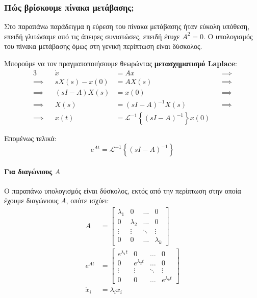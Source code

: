 \documentclass[11pt,a4paper,notitlepage,fleqn]{article}
\begin{document}
\subsubsection{Πώς βρίσκουμε πίνακα μετάβασης;}

Στο παραπάνω παράδειγμα η εύρεση του πίνακα μετάβασης ήταν εύκολη υπόθεση, επειδή γλιτώσαμε από τις άπειρες
συνιστώσες, επειδή έτυχε \( A^2 = 0 \). Ο υπολογισμός του πίνακα μετάβασης όμως στη γενική περίπτωση είναι
δύσκολος.

Μπορούμε να τον πραγματοποιήσουμε θεωρώντας \textbf{μετασχηματισμό Laplace}:
\begin{alignat*}{3}
	&& \dot x &= Ax &&\implies \\
	\implies && sX(s) - x(0) &= AX(s) &&\implies \\
	\implies && (sI-A)X(s) &= x(0) &&\implies \\
	\implies && X(s) &= (sI-A)^{-1} X(s) &&\implies \\
	\implies && x(t) &= \mathscr L^{-1} \left\lbrace (sI-A)^{-1} \right\rbrace x(0)
\end{alignat*}

Επομένως τελικά:
\[
\boxed{e^{At} = \mathscr{L}^{-1} \left\lbrace (sI-A)^{-1} \right\rbrace}
\]

\paragraph{Για διαγώνιους \(A\)}
Ο παραπάνω υπολογισμός είναι δύσκολος, εκτός από την περίπτωση στην οποία έχουμε διαγώνιους \( A \), οπότε ισχύει:
\begin{align*}
	A &= \left[\begin{matrix}
	\lambda_1 & 0 & \hdots & 0 \\
	0 & \lambda_2 & \hdots & 0 \\
	\vdots & \vdots & \ddots & \vdots \\
	0 & 0 & \hdots & \lambda_k
	\end{matrix}\right] \\
	e^{At} &= \left[\begin{matrix}
	e^{\lambda_1t} & 0 & \hdots & 0 \\
	0 & e^{\lambda_2t} & \hdots & 0 \\
	\vdots & \vdots & \ddots & \vdots \\
	0 & 0 & \hdots & e^{\lambda_kt}
	\end{matrix}\right]\\
	\dot x_i &= \lambda_i x_i
\end{align*}
\end{document}
